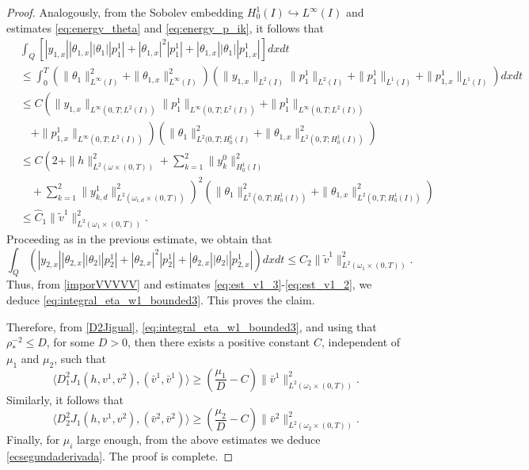 \documentclass[11pt,a4paper]{amsart}
\numberwithin{equation}{section}
\begin{document}
\begin{proof}
\noindent Analogously, from the Sobolev embedding $H^1_0(I) \hookrightarrow L^\infty(I)$ and estimates \eqref{eq:energy_theta} and  \eqref{eq:energy_p_ik}, it follows that
\begin{equation}\label{eq:est_v1_1}
\begin{split}
&\int_Q \left[|y_{1,x}||\theta_{1,x}| |\theta_1| |p^1_1| + |\theta_{1,x}|^2 |p^1_1| + |\theta_{1,x}| |\theta_1| |p^1_{1,x}|\right] dx dt\\
&\leq \int_0^T \left( \|\theta_{1}\|_{L^\infty(I)}^2 + \|\theta_{1,x}\|_{L^\infty(I)}^2 \right) \left( \| y_{1,x} \|_{L^2(I)} \| p_{1}^1 \|_{L^2(I)} + \| p_{1}^1 \|_{L^1(I)} + \| p_{1,x}^1 \|_{L^1(I)} \right) dxdt\\
& \leq C \left( \| y_{1,x} \|_{L^\infty(0,T;L^2(I))} \| p_{1}^1 \|_{L^\infty(0,T;L^2(I))} + \| p_{1}^1 \|_{L^\infty(0,T;L^2(I))} \right. \\
            & \left. \quad + \| p_{1,x}^1 \|_{L^\infty(0,T;L^2(I))} \right)  \left( \|\theta_{1}\|_{L^2(0,T;H_0^1(I)}^2 + \|\theta_{1,x}\|_{L^2(0,T;H_0^1(I))}^2 \right) \\
& \leq C\left( 2+\|h\|^2_{L^2(\omega\times (0,T))} + \sum_{k=1}^2 \|y_k^0\|^2_{H_0^1(I)} \right. \\
            &\left.\quad + \sum_{k=1}^2 \|y_{k,d}^1\|_{L^2(\omega_{i,d}\times (0,T))}^2  \right)^2 \left( \|\theta_{1}\|_{L^2(0,T;H_0^1(I))}^2 + \|\theta_{1,x}\|_{L^2(0,T;H_0^1(I))}^2 \right) \\
            &\leq \widehat{C}_1\|\widetilde{v}^1\|^2_{L^2(\omega_1\times (0,T))}.
\end{split}
\end{equation}
Proceeding as in the previous estimate, we obtain that
 \begin{equation}
        \label{eq:est_v1_2}
        \int_Q \left( |y_{2,x}||\theta_{2,x}| |\theta_2| |p^1_2| + |\theta_{2,x}|^2 |p^1_2| + |\theta_{2,x}| |\theta_2| |p^1_{2,x}| \right) dxdt \leq C_2 \|\widetilde{v}^1\|^2_{L^2(\omega_1\times (0,T))}.
    \end{equation}Thus, from \eqref{imporVVVVV} and estimates \eqref{eq:est_v1_3}-\eqref{eq:est_v1_2}, we deduce \eqref{eq:integral_eta_w1_bounded3}. This proves the claim.

    Therefore, from \eqref{D2Jigual}, \eqref{eq:integral_eta_w1_bounded3},  and using that $\rho_*^{-2} \leq D$, for some $D>0$, then there exists a positive constant  $C$, independent of $\mu_1$ and $\mu_2$, such that
    \begin{equation*}
        \langle D_1^2 J_1(h,v^1,v^2), (\bar{v}^{1}, \bar{v}^{1}) \rangle \geq  (\frac{\mu_1}{D} -C) \|\bar{v}^1\|^2_{L^2(\omega_1\times (0,T))}.
    \end{equation*}Similarly, it follows that
    \begin{equation*}
         \langle D_2^2 J_1(h,v^1,v^2), (\bar{v}^{2}, \bar{v}^{2}) \rangle \geq  (\frac{\mu_2}{D}-C) \|\bar{v}^2\|^2_{L^2(\omega_2\times (0,T))}.   
    \end{equation*}
    Finally, for $\mu_i$  large enough, from the above estimates we deduce \eqref{ecsegundaderivada}. The proof is complete. 
\end{proof}
\end{document}
